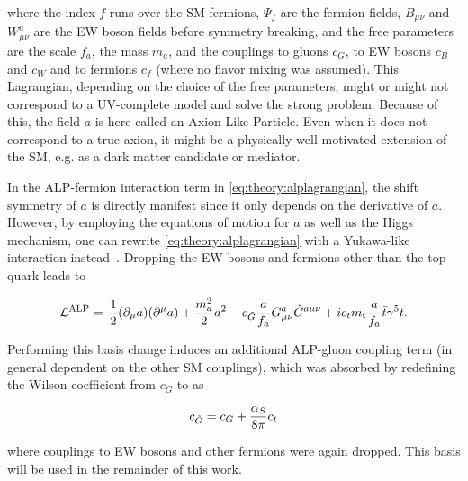 \noindent where the index $f$ runs over the SM fermions, $\Psi_f$ are the fermion fields, $B_{\mu \nu}$ and $W^{a}_{\mu \nu}$ are the EW boson fields before symmetry breaking, and the free parameters are the scale $f_a$, the mass $m_a$, and the couplings to gluons $c_G$, to EW bosons $c_B$ and $c_W$ and to fermions $c_f$ (where no flavor mixing was assumed). This Lagrangian, depending on the choice of the free parameters, might or might not correspond to a UV-complete model and solve the strong \CP problem. Because of this, the field $a$ is here called an Axion-Like Particle. Even when it does not correspond to a true axion, it might be a physically well-motivated extension of the SM, e.g. as a dark matter candidate or mediator.

In the ALP-fermion interaction term in \cref{eq:theory:alplagrangian}, the shift symmetry of $a$ is directly manifest since it only depends on the derivative of $a$. However, by employing the equations of motion for $a$ as well as the Higgs mechanism, one can rewrite \cref{eq:theory:alplagrangian} with a Yukawa-like interaction instead~\cite{Brivio:2017ije,Bauer:2020jbp,Bonnefoy:2022rik}. Dropping the EW bosons and fermions other than the top quark leads to

\begin{equation}
\label{eq:theory:alplagrangian2}
    \mathcal{L}^{\mathrm{ALP}} = \, \frac{1}{2} (\partial_\mu a) (\partial^\mu a)
    + \frac{m_a^2}{2} a^2
    - c_{\tilde{G}} \frac{a}{f_a} G^{a}_{\mu \nu} \tilde{G}^{a \mu \nu}
    + i c_t m_{\mathrm{t}} \frac{a}{f_a} \bar{t} \gamma^5 t .
\end{equation}

Performing this basis change induces an additional ALP-gluon coupling term (in general dependent on the other SM couplings), which was absorbed by redefining the Wilson coefficient from $c_G$ to \cG as~\cite{Bauer:2020jbp,Jeppe:2024sxt}

\begin{equation}
  c_{\tilde{G}} = c_G + \frac{\alpha_S}{8 \pi} c_t
\end{equation}

\noindent where couplings to EW bosons and other fermions were again dropped. This basis will be used in the remainder of this work. 

